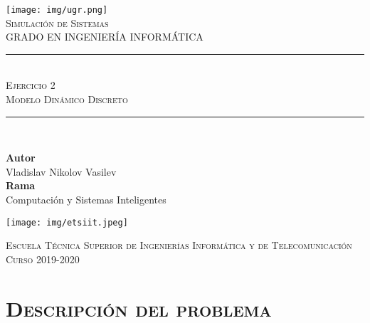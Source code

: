 \documentclass[11pt,a4paper]{article}
\newcommand{\asignatura}{Simulación de Sistemas}
\newcommand{\autor}{Vladislav Nikolov Vasilev}
\newcommand{\titulo}{Ejercicio 2}
\newcommand{\subtitulo}{Modelo Dinámico Discreto}
\begin{document}

\begin{titlepage}

\begin{minipage}{\textwidth}

\centering

\texttt{[image: img/ugr.png]}\\

\textsc{\Large \asignatura{}\\[0.2cm]}
\textsc{GRADO EN INGENIERÍA INFORMÁTICA}\\[1cm]

\noindent\rule[-1ex]{\textwidth}{1pt}\\[1.5ex]
\textsc{{\Huge \titulo\\[0.5ex]}}
\textsc{{\Large \subtitulo\\}}
\noindent\rule[-1ex]{\textwidth}{2pt}\\[3.5ex]

\end{minipage}

\vspace{0.5cm}

\begin{minipage}{\textwidth}

\centering

\textbf{Autor}\\ {\autor{}}\\[2.5ex]
\textbf{Rama}\\ {Computación y Sistemas Inteligentes}\\[2.5ex]
\vspace{0.3cm}

\texttt{[image: img/etsiit.jpeg]}

\vspace{0.7cm}
\textsc{Escuela Técnica Superior de Ingenierías Informática y de Telecomunicación}\\
\vspace{1cm}
\textsc{Curso 2019-2020}
\end{minipage}
\end{titlepage}

\tableofcontents
\thispagestyle{empty}				%

\newpage

\setlength{\parskip}{1em}

\section{\textsc{Descripción del problema}}
\end{document}
